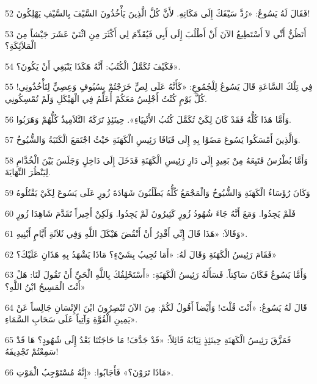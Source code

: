 \par 52 فَقَالَ لَهُ يَسُوعُ: «رُدَّ سَيْفَكَ إِلَى مَكَانِهِ. لأَنَّ كُلَّ الَّذِينَ يَأْخُذُونَ السَّيْفَ بِالسَّيْفِ يَهْلِكُونَ!
\par 53 أَتَظُنُّ أَنِّي لاَ أَسْتَطِيعُ الآنَ أَنْ أَطْلُبَ إِلَى أَبِي فَيُقَدِّمَ لِي أَكْثَرَ مِنِ اثْنَيْ عَشَرَ جَيْشاً مِنَ الْمَلاَئِكَةِ؟
\par 54 فَكَيْفَ تُكَمَّلُ الْكُتُبُ: أَنَّهُ هَكَذَا يَنْبَغِي أَنْ يَكُونَ؟».
\par 55 فِي تِلْكَ السَّاعَةِ قَالَ يَسُوعُ لِلْجُمُوعِ: «كَأَنَّهُ عَلَى لِصٍّ خَرَجْتُمْ بِسُيُوفٍ وَعِصِيٍّ لِتَأْخُذُونِي! كُلَّ يَوْمٍ كُنْتُ أَجْلِسُ مَعَكُمْ أُعَلِّمُ فِي الْهَيْكَلِ وَلَمْ تُمْسِكُونِي.
\par 56 وَأَمَّا هَذَا كُلُّهُ فَقَدْ كَانَ لِكَيْ تُكَمَّلَ كُتُبُ الأَنْبِيَاءِ». حِينَئِذٍ تَرَكَهُ التَّلاَمِيذُ كُلُّهُمْ وَهَرَبُوا.
\par 57 وَالَّذِينَ أَمْسَكُوا يَسُوعَ مَضَوْا بِهِ إِلَى قَيَافَا رَئِيسِ الْكَهَنَةِ حَيْثُ اجْتَمَعَ الْكَتَبَةُ وَالشُّيُوخُ.
\par 58 وَأَمَّا بُطْرُسُ فَتَبِعَهُ مِنْ بَعِيدٍ إِلَى دَارِ رَئِيسِ الْكَهَنَةِ فَدَخَلَ إِلَى دَاخِلٍ وَجَلَسَ بَيْنَ الْخُدَّامِ لِيَنْظُرَ النِّهَايَةَ.
\par 59 وَكَانَ رُؤَسَاءُ الْكَهَنَةِ وَالشُّيُوخُ وَالْمَجْمَعُ كُلُّهُ يَطْلُبُونَ شَهَادَةَ زُورٍ عَلَى يَسُوعَ لِكَيْ يَقْتُلُوهُ
\par 60 فَلَمْ يَجِدُوا. وَمَعَ أَنَّهُ جَاءَ شُهُودُ زُورٍ كَثِيرُونَ لَمْ يَجِدُوا. وَلَكِنْ أَخِيراً تَقَدَّمَ شَاهِدَا زُورٍ
\par 61 وَقَالاَ: «هَذَا قَالَ إِنِّي أَقْدِرُ أَنْ أَنْقُضَ هَيْكَلَ اللَّهِ وَفِي ثَلاَثَةِ أَيَّامٍ أَبْنِيهِ».
\par 62 فَقَامَ رَئِيسُ الْكَهَنَةِ وَقَالَ لَهُ: «أَمَا تُجِيبُ بِشَيْءٍ؟ مَاذَا يَشْهَدُ بِهِ هَذَانِ عَلَيْكَ؟»
\par 63 وَأَمَّا يَسُوعُ فَكَانَ سَاكِتاً. فَسَأَلَهُ رَئِيسُ الْكَهَنَةِ: «أَسْتَحْلِفُكَ بِاللَّهِ الْحَيِّ أَنْ تَقُولَ لَنَا: هَلْ أَنْتَ الْمَسِيحُ ابْنُ اللَّهِ؟»
\par 64 قَالَ لَهُ يَسُوعُ: «أَنْتَ قُلْتَ! وَأَيْضاً أَقُولُ لَكُمْ: مِنَ الآنَ تُبْصِرُونَ ابْنَ الإِنْسَانِ جَالِساً عَنْ يَمِينِ الْقُوَّةِ وَآتِياً عَلَى سَحَابِ السَّمَاءِ».
\par 65 فَمَزَّقَ رَئِيسُ الْكَهَنَةِ حِينَئِذٍ ثِيَابَهُ قَائِلاً: «قَدْ جَدَّفَ! مَا حَاجَتُنَا بَعْدُ إِلَى شُهُودٍ؟ هَا قَدْ سَمِعْتُمْ تَجْدِيفَهُ!
\par 66 مَاذَا تَرَوْنَ؟» فَأَجَابُوا: «إِنَّهُ مُسْتَوْجِبُ الْمَوْتِ».
